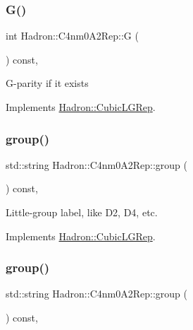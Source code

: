 \subsubsection{\texorpdfstring{G()}{G()}\hspace{0.1cm}{\footnotesize\ttfamily [2/2]}}
{\footnotesize\ttfamily int Hadron\+::\+C4nm0\+A2\+Rep\+::G (\begin{DoxyParamCaption}{ }\end{DoxyParamCaption}) const\hspace{0.3cm}{\ttfamily [inline]}, {\ttfamily [virtual]}}

G-\/parity if it exists 

Implements \mbox{\hyperlink{structHadron_1_1CubicLGRep_ace26f7b2d55e3a668a14cb9026da5231}{Hadron\+::\+Cubic\+L\+G\+Rep}}.

\mbox{\label{structHadron_1_1C4nm0A2Rep_aaba4ff31952a682fa280fc4c8803dbc3}} 
\subsubsection{\texorpdfstring{group()}{group()}\hspace{0.1cm}{\footnotesize\ttfamily [1/3]}}
{\footnotesize\ttfamily std\+::string Hadron\+::\+C4nm0\+A2\+Rep\+::group (\begin{DoxyParamCaption}{ }\end{DoxyParamCaption}) const\hspace{0.3cm}{\ttfamily [inline]}, {\ttfamily [virtual]}}

Little-\/group label, like D2, D4, etc. 

Implements \mbox{\hyperlink{structHadron_1_1CubicLGRep_a9bdb14b519a611d21379ed96a3a9eb41}{Hadron\+::\+Cubic\+L\+G\+Rep}}.

\mbox{\label{structHadron_1_1C4nm0A2Rep_aaba4ff31952a682fa280fc4c8803dbc3}} 
\subsubsection{\texorpdfstring{group()}{group()}\hspace{0.1cm}{\footnotesize\ttfamily [2/3]}}
{\footnotesize\ttfamily std\+::string Hadron\+::\+C4nm0\+A2\+Rep\+::group (\begin{DoxyParamCaption}{ }\end{DoxyParamCaption}) const\hspace{0.3cm}{\ttfamily [inline]}, {\ttfamily [virtual]}}

